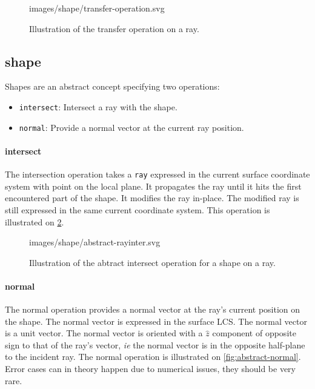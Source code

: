 \begin{figure} \caption{\label{fig:transfer-operation}
Illustration of the transfer operation on a ray.}

           {images/shape/transfer-operation.svg}
\end{figure}

\subsection{shape}
Shapes are an abstract concept specifying two operations:

\begin{itemize}
\item \lstinline{intersect}: Intersect a ray with the shape.
\item \lstinline{normal}: Provide a normal vector at the current ray
      position.
\end{itemize}

\paragraph{intersect}
The intersection operation takes a \lstinline{ray} expressed in the current
surface coordinate system with point on the local plane. It propagates
the ray until it hits the first encountered part of the shape. It modifies
the ray in-place. The modified ray is still expressed in the same current
coordinate system. This operation is illustrated on
\cref{fig:abstract-rayinter}.

\begin{figure} \caption{\label{fig:abstract-rayinter} Illustration of the
abtract intersect operation for a shape on a ray.}

           {images/shape/abstract-rayinter.svg}
\end{figure}

\paragraph{normal}
The normal operation provides a normal vector at the ray's current
position on the shape. The normal vector is expressed in the surface
LCS. The normal vector is a unit vector. The normal vector is oriented
with a $\hat{z}$ component of opposite sign to that of the ray's vector,
\textit{ie} the normal vector is in the opposite half-plane to the incident
ray. The normal operation is illustrated on \cref{fig:abstract-normal}. Error
cases can in theory happen due to numerical issues, they should be very rare.


